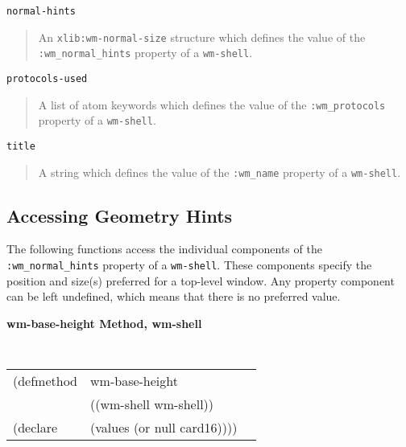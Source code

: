 \documentclass[twoside]{book}
\begin{document}
\begin{sloppy}
\begin{flushright} \parbox[t]{6.125in}{
{\tt normal-hints}
\begin{quote}
An {\tt xlib:wm-normal-size} structure which defines the value of the
{\tt :wm\_normal\_hints} property of a {\tt wm-shell}. 
\end{quote}
}\end{flushright}

\begin{flushright} \parbox[t]{6.125in}{
{\tt protocols-used}
\begin{quote}
A list of atom keywords which defines the value of the
{\tt :wm\_protocols} property of a {\tt wm-shell}.
\end{quote}

}\end{flushright}

\begin{flushright} \parbox[t]{6.125in}{
{\tt title   }
\begin{quote}
A string which defines the value of the
{\tt :wm\_name} property of a {\tt wm-shell}. 
\end{quote}

}\end{flushright}

{\samepage
\subsection*{Accessing Geometry Hints}

The following functions access the individual components of the {\tt
:wm\_normal\_hints} property of a {\tt wm-shell}. These components specify the
position and size(s) preferred for a top-level window. Any property component
can be left undefined, which means that there is no preferred value.

}

{\samepage
{\large {\bf wm-base-height \hfill Method, wm-shell}}
\begin{flushright} \parbox[t]{6.125in}{
\tt
\begin{tabular}{lll}
\raggedright
(defmethod & wm-base-height & \\
           & ((wm-shell  wm-shell)) \\
(declare   & (values (or null card16))))
\end{tabular}
\rm

}
\end{flushright}}
\end{sloppy}
\end{document}
